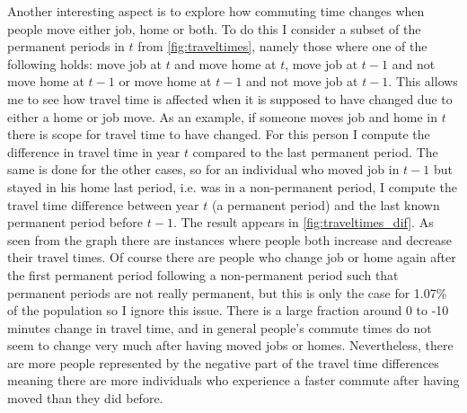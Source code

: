 Another interesting aspect is to explore how commuting time changes when people move either job, home or both. To do this I consider a subset of the permanent periods in $t$ from \autoref{fig:traveltimes}, namely those where one of the following holds: move job at $t$ and move home at $t$, move job at $t-1$ and not move home at $t-1$ or move home at $t-1$ and not move job at $t-1$. This allows me to see how travel time is affected when it is supposed to have changed due to either a home or job move. As an example, if someone moves job and home in $t$ there is scope for travel time to have changed. For this person I compute the difference in travel time in year $t$ compared to the last permanent period. The same is done for the other cases, so for an individual who moved job in $t-1$ but stayed in his home last period, i.e. was in a non-permanent period, I compute the travel time difference between year $t$ (a permanent period) and the last known permanent period before $t-1$. The result appears in \autoref{fig:traveltimes_dif}. As seen from the graph there are instances where people both increase and decrease their travel times. Of course there are people who change job or home again after the first permanent period following a non-permanent period such that permanent periods are not really permanent, but this is only the case for 1.07\% of the population so I ignore this issue. There is a large fraction around 0 to -10 minutes change in travel time, and in general people's commute times do not seem to change very much after having moved jobs or homes. Nevertheless, there are more people represented by the negative part of the travel time differences meaning there are more individuals who experience a faster commute after having moved than they did before.

